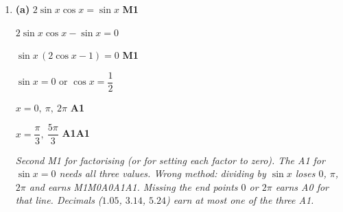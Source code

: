 \documentclass[12pt, twoside]{article}
\begin{document}
\begin{enumerate}[itemsep=0.1cm]
bearing $= 70^\circ + 40.3380\ldots^\circ$ \hfill \textbf{M1}

$= 110^\circ$ \quad $(110.338\ldots)$ \hfill \textbf{A1}

\emph{Accept $110.3^\circ$. Accept the cosine rule for $A\hat{H}B$. The
angle is opposite the shorter side $9 < 13.69$, so it is acute: no
ambiguous case. FT from (b). Wrong methods: $40.3^\circ$ given as the
bearing, M1A1M0A0; $70^\circ - 40.3^\circ = 29.7^\circ$, M1A1M0A0; the angle
at $B$, $59.7^\circ$, added to $70^\circ$ gives $130^\circ$, M0A0M1A0.}

\textbf{(d)} $110.338\ldots^\circ + 180^\circ = 290^\circ$
\quad $(290.338\ldots)$ \hfill \textbf{A1}

\emph{Accept $290.3^\circ$. FT from (c). Wrong methods, each A0:
$360^\circ - 110^\circ = 250^\circ$; $180^\circ - 110^\circ = 70^\circ$.}

\textbf{(e)} area $= \dfrac{1}{2} \times 12 \times 9\sin 80^\circ$
\hfill \textbf{M1}

$= 53.2\ \text{km}^{2}$ \quad $(53.1796\ldots)$ \hfill \textbf{A1}

\emph{Accept any two sides with their included angle, e.g.\
$\frac{1}{2} \times 12 \times 13.6927\ldots \sin 40.3380\ldots^\circ$. Wrong
method: an angle not included between the two sides, e.g.\
$\frac{1}{2} \times 12 \times 13.69\sin 80^\circ = 80.9$, earns M0A0.
Note: $\sin 100^\circ = \sin 80^\circ$, so the wrong angle from (a) gives
the correct area; (a) fixes the angle at $80^\circ$.}

\newpage

\item[3.] [Maximum mark: 11]

\textbf{(a)} $2\sin x\cos x = \sin x$ \hfill \textbf{M1}

$2\sin x\cos x - \sin x = 0$

$\sin x\,(2\cos x - 1) = 0$ \hfill \textbf{M1}

$\sin x = 0$ \quad or \quad $\cos x = \dfrac{1}{2}$

$x = 0,\ \pi,\ 2\pi$ \hfill \textbf{A1}

$x = \dfrac{\pi}{3},\ \dfrac{5\pi}{3}$ \hfill \textbf{A1A1}

\emph{Second M1 for factorising (or for setting each factor to zero).
The A1 for $\sin x = 0$ needs all three values. Wrong method: dividing by
$\sin x$ loses $0$, $\pi$, $2\pi$ and earns M1M0A0A1A1. Missing the end
points $0$ or $2\pi$ earns A0 for that line. Decimals ($1.05$, $3.14$,
$5.24$) earn at most one of the three A1.}


\end{enumerate}
\end{document}
